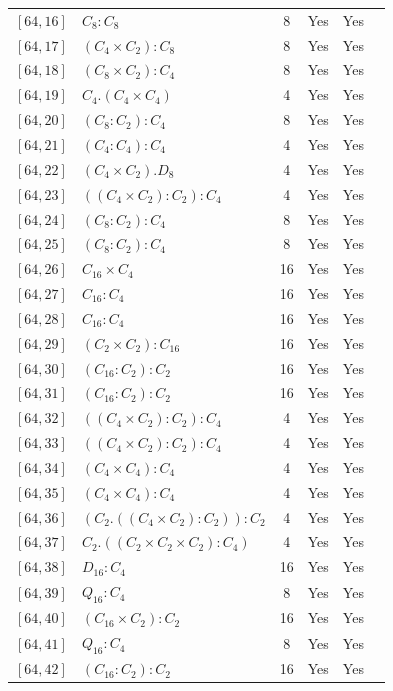 \documentclass[12pt, a4paper]{article}
\theoremstyle{plain}
\theoremstyle{definition}
\begin{document}
\begin{longtable}{llcccl}
  $[64,16]$ & $C_8 : C_8$ & 8 & Yes & Yes \\
  $[64,17]$ & $(C_4 \times C_2) : C_8$ & 8 & Yes & Yes \\
  $[64,18]$ & $(C_8 \times C_2) : C_4$ & 8 & Yes & Yes \\
  $[64,19]$ & $C_4 . (C_4 \times C_4)$ & 4 & Yes & Yes \\
  $[64,20]$ & $(C_8 : C_2) : C_4$ & 8 & Yes & Yes \\
  $[64,21]$ & $(C_4 : C_4) : C_4$ & 4 & Yes & Yes \\
  $[64,22]$ & $(C_4 \times C_2) . D_8$ & 4 & Yes & Yes \\
  $[64,23]$ & $((C_4 \times C_2) : C_2) : C_4$ & 4 & Yes & Yes \\
  $[64,24]$ & $(C_8 : C_2) : C_4$ & 8 & Yes & Yes \\
  $[64,25]$ & $(C_8 : C_2) : C_4$ & 8 & Yes & Yes \\
  $[64,26]$ & $C_{16} \times C_4$ & 16 & Yes & Yes \\
  $[64,27]$ & $C_{16} : C_4$ & 16 & Yes & Yes \\
  $[64,28]$ & $C_{16} : C_4$ & 16 & Yes & Yes \\
  $[64,29]$ & $(C_2 \times C_2) : C_{16}$ & 16 & Yes & Yes \\
  $[64,30]$ & $(C_{16} : C_2) : C_2$ & 16 & Yes & Yes \\
  $[64,31]$ & $(C_{16} : C_2) : C_2$ & 16 & Yes & Yes \\
  $[64,32]$ & $((C_4 \times C_2) : C_2) : C_4$ & 4 & Yes & Yes \\
  $[64,33]$ & $((C_4 \times C_2) : C_2) : C_4$ & 4 & Yes & Yes \\
  $[64,34]$ & $(C_4 \times C_4) : C_4$ & 4 & Yes & Yes \\
  $[64,35]$ & $(C_4 \times C_4) : C_4$ & 4 & Yes & Yes \\
  $[64,36]$ & $(C_2 . ((C_4 \times C_2) : C_2)) : C_2$ & 4 & Yes & Yes \\
  $[64,37]$ & $C_2 . ((C_2 \times C_2 \times C_2) : C_4)$ & 4 & Yes & Yes \\
  $[64,38]$ & $D_{16} : C_4$ & 16 & Yes & Yes \\
  $[64,39]$ & $Q_{16} : C_4$ & 8 & Yes & Yes \\
  $[64,40]$ & $(C_{16} \times C_2) : C_2$ & 16 & Yes & Yes \\
  $[64,41]$ & $Q_{16} : C_4$ & 8 & Yes & Yes \\
  $[64,42]$ & $(C_{16} : C_2) : C_2$ & 16 & Yes & Yes \\

\end{longtable}
\end{document}
